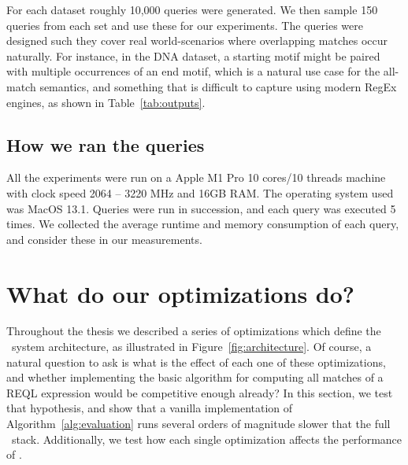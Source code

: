 For each dataset roughly 10,000 queries were generated. We then sample 150 queries from each set and use these for our experiments. The queries were designed such they cover real world-scenarios where overlapping matches occur naturally. For instance, in the \textsf{DNA} dataset, a starting motif might be paired with multiple occurrences of an end motif, which is a natural use case for the all-match semantics, and something that is difficult to capture using modern RegEx engines, as shown in Table~\ref{tab:outputs}. 


\subsection{How we ran the queries}
All the experiments were run on a Apple M1 Pro 10 cores/10 threads machine with clock speed 2064 -- 3220 MHz and 16GB RAM. The operating system used was MacOS 13.1.   Queries were run in succession, and each query was executed 5 times. We collected the average runtime and memory consumption of each query, and consider these in our measurements.

\section{What do our optimizations do?}\label{ss:internal}
Throughout the thesis we described a series of optimizations which define the \rematch\ system architecture, as illustrated in Figure~\ref{fig:architecture}. Of course, a natural question to ask is what is the effect of each one of these optimizations, and whether implementing the basic algorithm for computing all matches of a REQL expression  would be competitive enough already? In this section, we test that hypothesis, and show that a vanilla implementation of Algorithm~\ref{alg:evaluation} runs several orders of magnitude slower that the full \rematch\ stack. Additionally, we test how each single optimization affects the performance of \rematch.




